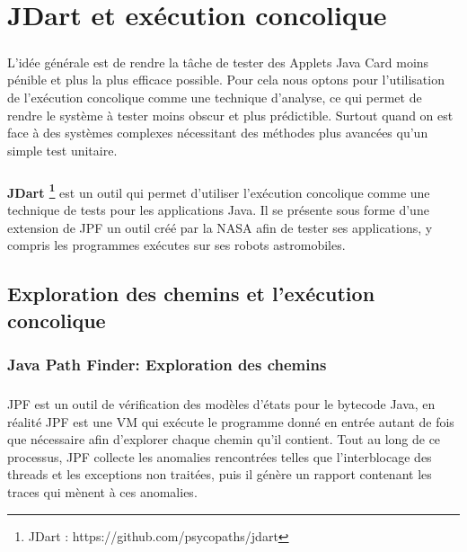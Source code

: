 \chapter{JDart et exécution concolique}
	\nocite{Concolic}
	\paragraph{}
		L'idée générale est de rendre la tâche de tester des Applets Java Card moins pénible et plus la plus efficace possible.
		Pour cela nous optons pour l'utilisation de l'exécution concolique comme une technique d'analyse, ce qui permet de rendre 
		le système à tester moins obscur et plus prédictible. Surtout quand on est face à des systèmes complexes
		nécessitant des méthodes plus avancées qu'un simple test unitaire.
    
	\paragraph{}
		\textbf{JDart \footnote{JDart : https://github.com/psycopaths/jdart}} est un outil qui permet d'utiliser l'exécution concolique
		comme une technique de tests pour les applications Java.
		\newline
		Il se présente sous forme d'une extension de \gls{JPF} un outil créé par la NASA afin de tester ses applications, y compris les programmes exécutes sur ses robots astromobiles.
	\section{Exploration des chemins et l'exécution concolique}
		\subsection{Java Path Finder: Exploration des chemins}
			\nocite{JPF}
			
			\paragraph{}
				\gls{JPF} est un outil de vérification des modèles d'états pour le bytecode Java,
				en réalité \gls{JPF} est une \gls{VM} qui exécute le programme donné en entrée autant de fois que nécessaire
				afin d'explorer chaque chemin qu'il contient.
				Tout au long de ce processus, \gls{JPF} collecte les anomalies rencontrées telles que l'interblocage des threads et les exceptions non traitées, puis il génère un rapport contenant les traces qui mènent à ces anomalies.
	
